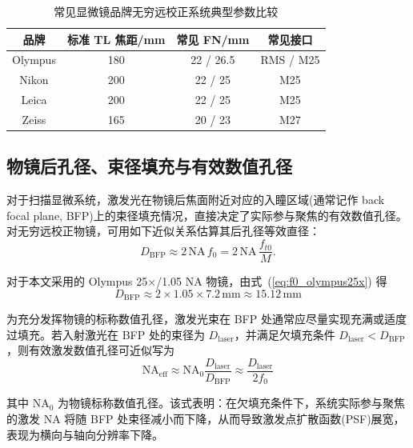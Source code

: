 \begin{table}[htbp]
\centering
\caption{常见显微镜品牌无穷远校正系统典型参数比较}
\label{tab:objective_brand_compare}
\setlength{\tabcolsep}{4pt}
\begin{tabular}{|c|c|c|c|}
\hline
品牌 & 标准 TL 焦距/mm & 常见 FN/mm & 常见接口 \\ \hline
Olympus & 180 & 22 / 26.5 & RMS / M25 \\ \hline
Nikon   & 200 & 22 / 25   & M25 \\ \hline
Leica   & 200 & 22 / 25   & M25 \\ \hline
Zeiss   & 165 & 20 / 23   & M27 \\ \hline
\end{tabular}
\end{table}




\subsection{物镜后孔径、束径填充与有效数值孔径}\label{2.4.2}

对于扫描显微系统，激发光在物镜后焦面附近对应的入瞳区域(通常记作 back focal plane, BFP)上的束径填充情况，直接决定了实际参与聚焦的有效数值孔径。对无穷远校正物镜，可用如下近似关系估算其后孔径等效直径：
\begin{equation}
  D_{\mathrm{BFP}}\approx 2\,\mathrm{NA}\,f_0
  =2\,\mathrm{NA}\,\frac{f_{t0}}{M}.
  \label{eq:Dbfp}
  \end{equation}

对于本文采用的 Olympus 25$\times$/1.05 NA 物镜，由式~(\ref{eq:f0_olympus25x}) 得
\begin{equation}
  D_{\mathrm{BFP}}\approx 2\times1.05\times7.2\,\mathrm{mm}\approx 15.12\,\mathrm{mm}
  \label{eq:Dbfp_olympus}
\end{equation}

为充分发挥物镜的标称数值孔径，激发光束在 BFP 处通常应尽量实现充满或适度过填充。若入射激光在 BFP 处的束径为 $D_{\mathrm{laser}}$，并满足欠填充条件 $D_{\mathrm{laser}}<D_{\mathrm{BFP}}$，则有效激发数值孔径可近似写为
\begin{equation}
  \mathrm{NA}_{\mathrm{eff}}\approx \mathrm{NA}_{0}\frac{D_{\mathrm{laser}}}{D_{\mathrm{BFP}}}
  \approx \frac{D_{\mathrm{laser}}}{2f_0}
  \label{eq:NAeff}
\end{equation}

其中 $\mathrm{NA}_{0}$ 为物镜标称数值孔径。该式表明：在欠填充条件下，系统实际参与聚焦的激发 NA 将随 BFP 处束径减小而下降，从而导致激发点扩散函数(PSF)展宽，表现为横向与轴向分辨率下降。

